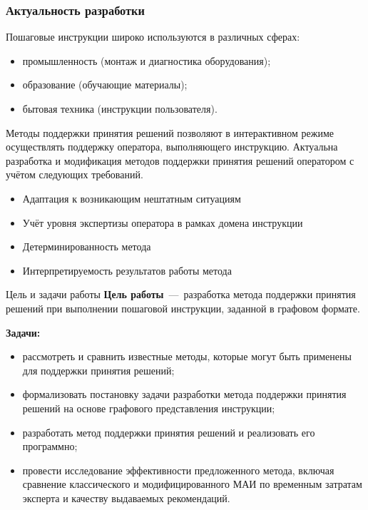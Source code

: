 \documentclass{beamer}
\begin{document}
\begin{frame}
    \frametitle{Актуальность разработки}
    Пошаговые инструкции широко используются в различных сферах:
    \begin{itemize}
        \item[---] промышленность (монтаж и диагностика оборудования);
        \item[---] образование (обучающие материалы);
        \item[---] бытовая техника (инструкции пользователя).
    \end{itemize}
    \vfill
    Методы поддержки принятия решений позволяют в интерактивном режиме осуществлять поддержку оператора, выполняющего инструкцию.
    \vfill
    Актуальна разработка и модификация методов поддержки принятия решений оператором с учётом следующих требований.
    \begin{itemize}
        \item[---] Адаптация к возникающим нештатным ситуациям 
        \item[---] Учёт уровня экспертизы оператора в рамках домена инструкции
        \item[---] Детерминированность метода
        \item[---] Интерпретируемость результатов работы метода
    \end{itemize}
    \vfill
\end{frame}


\begin{frame}{\centering Цель и задачи работы}
    \textbf{Цель работы}~---~разработка метода поддержки принятия решений при выполнении пошаговой инструкции, заданной в графовом формате.
    
    \vfill
    \textbf{Задачи:}
    \begin{itemize}
        \item[---] рассмотреть и сравнить известные методы, которые могут быть применены для поддержки принятия решений;
        \item[---] формализовать постановку задачи разработки метода поддержки принятия решений на основе графового представления инструкции;
        \item[---] разработать метод поддержки принятия решений и реализовать его программно;
        \item[---] провести исследование эффективности предложенного метода, включая сравнение классического и модифицированного МАИ по временным затратам эксперта и качеству выдаваемых рекомендаций.
    \end{itemize}
\end{frame}
\end{document}
